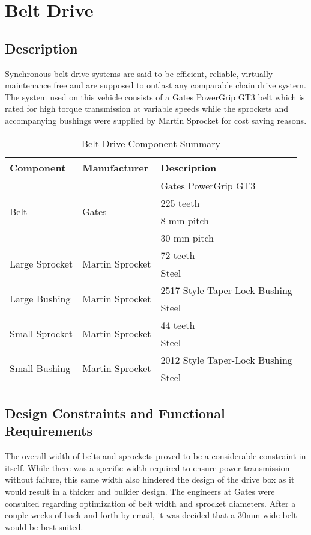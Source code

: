 \section{Belt Drive}\label{sec:belt_drive}
\subsection{Description}
Synchronous belt drive systems are said to be efficient, reliable, virtually maintenance free and are supposed to outlast any comparable chain drive system. The system used on this vehicle consists of a Gates PowerGrip GT3 belt which is rated for high torque transmission at variable speeds while the sprockets and accompanying bushings were supplied by Martin Sprocket for cost saving reasons.

\begin{table}[htbp]
	\centering
	\caption{Belt Drive Component Summary}
	\begin{tabular}{| lll |} \hline
		Component & Manufacturer & Description \\ \hline
		\multirow{4}{*}{Belt} & \multirow{4}{*}{Gates} & Gates PowerGrip GT3 \\
		& & 225 teeth \\
		& & 8 mm pitch \\
		& & 30 mm pitch \\ \hline
		\multirow{2}{*}{Large Sprocket} & \multirow{2}{*}{Martin Sprocket} & 72 teeth\\
		& & Steel \\ \hline
		\multirow{2}{*}{Large Bushing} & \multirow{2}{*}{Martin Sprocket} & 2517 Style Taper-Lock Bushing\\
		& & Steel \\ \hline
		\multirow{2}{*}{Small Sprocket} & \multirow{2}{*}{Martin Sprocket} & 44 teeth\\
		& & Steel \\ \hline
		\multirow{2}{*}{Small Bushing} & \multirow{2}{*}{Martin Sprocket} & 2012 Style Taper-Lock Bushing\\
		& & Steel \\ \hline
	\end{tabular}
	\label{tab:drive_comp}
\end{table}

\subsection{Design Constraints and Functional Requirements}
The overall width of belts and sprockets proved to be a considerable constraint in itself. While there was a specific width required to ensure power transmission without failure, this same width also hindered the design of the drive box as it would result in a thicker and bulkier design. The engineers at Gates were consulted regarding optimization of belt width and sprocket diameters. After a couple weeks of back and forth by email, it was decided that a 30mm wide belt would be best suited.


